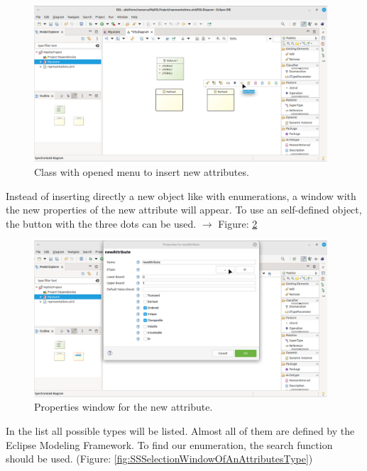 \documentclass[a4paper,10pt]{article}
\newcommand{\EMF}{Eclipse Modeling Framework}
\newcommand{\ScreenshotWidth}{0.975}
\begin{document}
\begin{figure}[H]
\centering
\includegraphics[width=\ScreenshotWidth\textwidth]{./Screenshots/SS_14.png}
\caption{Class with opened menu to insert new attributes.}
\label{fig:SSClassMenuForNewEntries}
\end{figure}

Instead of inserting directly a new object like with enumerations, a window with the new properties of the new attribute will appear. To use an self-defined object, the button with the three dots can be used. $\rightarrow$ Figure: \ref{fig:SSNewAttribute}

\begin{figure}[H]
\centering
\includegraphics[width=\ScreenshotWidth\textwidth]{./Screenshots/SS_15.png}
\caption{Properties window for the new attribute.}
\label{fig:SSNewAttribute}
\end{figure}

In the list all possible types will be listed. Almost all of them are defined by the \EMF. To find our enumeration, the search function should be used. (Figure: \ref{fig:SSSelectionWindowOfAnAttributesType})
\end{document}
